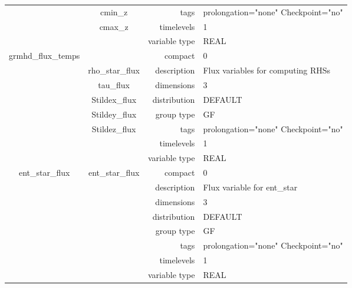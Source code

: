 \documentclass{article}
\begin{document}
\begin{tabular*}{150mm}{|c|c@{\extracolsep{\fill}}|rl|}
 & cmin\_z & tags & prolongation="none" Checkpoint="no" \\ 
 & cmax\_z & timelevels & 1 \\ 
 &  & variable type & REAL \\ 
\hline 
grmhd\_flux\_temps &  & compact & 0 \\ 
 & rho\_star\_flux & description & Flux variables for computing RHSs \\ 
 & tau\_flux & dimensions & 3 \\ 
 & Stildex\_flux & distribution & DEFAULT \\ 
 & Stildey\_flux & group type & GF \\ 
 & Stildez\_flux & tags & prolongation="none" Checkpoint="no" \\ 
 &  & timelevels & 1 \\ 
 &  & variable type & REAL \\ 
\hline 
ent\_star\_flux & ent\_star\_flux & compact & 0 \\ 
 &  & description & Flux variable for ent\_star \\ 
 &  & dimensions & 3 \\ 
 &  & distribution & DEFAULT \\ 
 &  & group type & GF \\ 
 &  & tags & prolongation="none" Checkpoint="no" \\ 
 &  & timelevels & 1 \\ 
 &  & variable type & REAL \\ 
\hline 
\end{tabular*} 



\vspace{5mm}
\vspace{5mm}
\end{document}
